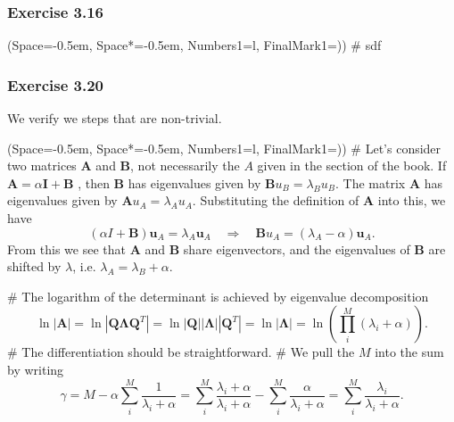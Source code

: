 \documentclass[12pt, a4paper]{article}
\newcommand{\listSpace}{-0.5em}%
\newcommand{\vect}[1]{\bm{#1}}
\newcommand{\abs}[1]{\left\lvert#1\right\rvert}
\begin{document}
\subsubsection*{Exercise 3.16}
\begin{easylist}[enumerate]
	\ListProperties(Space=\listSpace, Space*=\listSpace, Numbers1=l, FinalMark1={)})
	# sdf
\end{easylist}


\subsubsection*{Exercise 3.20}
We verify we steps that are non-trivial.
\begin{easylist}[itemize]
	\ListProperties(Space=\listSpace, Space*=\listSpace, Numbers1=l, FinalMark1={)})
	# Let's consider two matrices $\vect{A}$ and $\vect{B}$, not necessarily the $A$ given in the section of the book.
	If $\vect{A} = \alpha \vect{I} + \vect{B}$ , then $\vect{B}$ has eigenvalues given by
	$\vect{B} u_B = \lambda_B u_B$.
	The matrix $\vect{A}$ has eigenvalues given by $\vect{A} u_A = \lambda_A u_A$.
	Substituting the definition of $\vect{A}$ into this, we have
	\begin{equation*}
		\left( \alpha I + \vect{B} \right) \vect{u}_A = \lambda_A \vect{u}_A
		\quad \Rightarrow \quad
		\vect{B} u_A = (\lambda_A - \alpha) \vect{u}_A.
	\end{equation*}
	From this we see that $\vect{A}$ and $\vect{B}$ share eigenvectors, and the eigenvalues of $\vect{B}$ are shifted by $\lambda$, i.e. $\lambda_A = \lambda_B + \alpha$.
	
	# The logarithm of the determinant is achieved by eigenvalue decomposition
	\begin{equation*}
		\ln \abs{ \vect{A} }
		=
		\ln \abs{ \vect{Q} \vect{\Lambda} \vect{Q}^T }
		=
		\ln \abs{ \vect{Q} }
		\abs{  \vect{\Lambda}}
		\abs{  \vect{Q}^T }
		=
		\ln
		\abs{  \vect{\Lambda}}
		= \ln \left( \prod_{i}^{M} (\lambda_i + \alpha) \right).
	\end{equation*}
	# The differentiation should be straightforward.
	# We pull the $M$ into the sum by writing
	\begin{equation*}
		\gamma = M - \alpha \sum_{i}^{M} \frac{1}{\lambda_i + \alpha}
		=
		\sum_{i}^{M} \frac{\lambda_i + \alpha}{\lambda_i + \alpha} -  \sum_{i}^{M} \frac{\alpha}{\lambda_i + \alpha}
		=
		\sum_{i}^{M} \frac{\lambda_i}{\lambda_i + \alpha}.
	\end{equation*}
\end{easylist}
\end{document}
